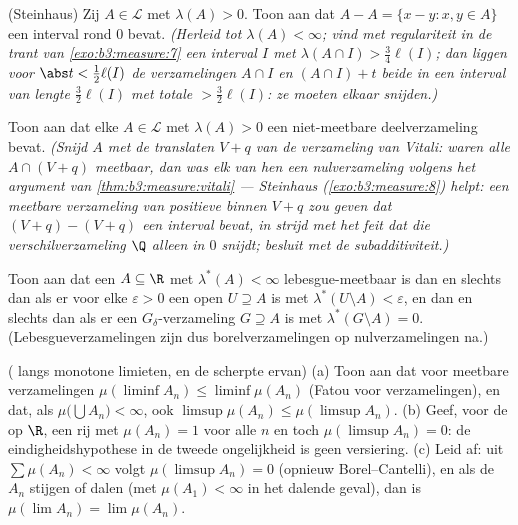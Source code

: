 \begin{exercise}[$\star\star\star$]\label{exo:b3:measure:8}
(Steinhaus) Zij $A \in \mathcal L$ met $\lambda(A) > 0$. Toon aan
dat $A - A = \{x - y : x, y \in A\}$ een interval rond $0$ bevat.
\emph{(Herleid tot $\lambda(A) < \infty$; vind met regulariteit in
de trant van \cref{exo:b3:measure:7} een interval $I$ met
$\lambda(A \cap I) > \frac34\ell(I)$; dan liggen voor $\abs t <
\frac12\ell(I)$ de verzamelingen $A\cap I$ en $(A\cap I) + t$
beide in een interval van lengte $\frac32\ell(I)$ met totale 
$> \frac32\ell(I)$: ze moeten elkaar snijden.)}
\end{exercise}

\begin{exercise}[$\star\star\star$]\label{exo:b3:measure:9}
Toon aan dat elke $A \in \mathcal L$ met $\lambda(A) > 0$ een
niet-meetbare deelverzameling bevat. \emph{(Snijd $A$ met de
translaten $V + q$ van de verzameling van Vitali: waren alle $A
\cap (V+q)$ meetbaar, dan was elk van hen een nulverzameling
volgens het argument van \cref{thm:b3:measure:vitali} ---
Steinhaus (\cref{exo:b3:measure:8}) helpt: een meetbare
verzameling van positieve  binnen $V + q$ zou geven dat
$(V+q) - (V+q)$ een interval bevat, in strijd met het feit dat die
verschilverzameling $\Q$ alleen in $0$ snijdt; besluit met de
subadditiviteit.)}
\end{exercise}

\begin{exercise}[$\star\star$]\label{exo:b3:measure:10}
Toon aan dat een $A \subseteq \R$ met $\lambda^*(A) < \infty$
lebesgue-meetbaar is dan en slechts dan als er voor elke
$\varepsilon > 0$ een open $U \supseteq A$ is met $\lambda^*(U
\setminus A) < \varepsilon$, en dan en slechts dan als er een
$G_\delta$-verzameling $G \supseteq A$ is met $\lambda^*(G\setminus
A) = 0$. (Lebesgueverzamelingen zijn dus borelverzamelingen op
nulverzamelingen na.)
\end{exercise}

\begin{exercise}[$\star\star$]\label{exo:b3:measure:11}
( langs monotone limieten, en de scherpte ervan)
(a) Toon aan dat voor meetbare verzamelingen $\mu(\liminf A_n)
\leq \liminf\mu(A_n)$ (Fatou voor verzamelingen), en dat, als
$\mu\bigl(\bigcup A_n\bigr) < \infty$, ook $\limsup\mu(A_n) \leq
\mu(\limsup A_n)$.
(b) Geef, voor de  op $\R$, een rij met $\mu(A_n) = 1$
voor alle $n$ en toch $\mu(\limsup A_n) = 0$: de
eindigheidshypothese in de tweede ongelijkheid is geen
versiering.
(c) Leid af: uit $\sum\mu(A_n) < \infty$ volgt $\mu(\limsup A_n) =
0$ (opnieuw Borel--Cantelli), en als de $A_n$ stijgen of dalen
(met $\mu(A_1) < \infty$ in het dalende geval), dan is $\mu(\lim
A_n) = \lim\mu(A_n)$.
\end{exercise}

